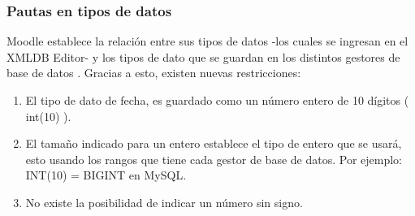 \subsubsection{Pautas en tipos de datos}

         Moodle establece la relación entre sus tipos de datos -los cuales se ingresan en el XMLDB Editor- y los tipos de dato que se guardan en los distintos gestores de base de datos \cite{moodleTiposBD}.  Gracias a esto, existen nuevas restricciones:
        \begin{enumerate}
            \item El tipo de dato de fecha, es guardado como un número entero de 10 dígitos ( int(10) ).
            \item El tamaño indicado para un entero establece el tipo de entero que se usará, esto usando los rangos que tiene cada gestor de base de datos. Por ejemplo: INT(10) = BIGINT en MySQL.
            \item No existe la posibilidad de indicar un número sin signo.
        \end{enumerate}
